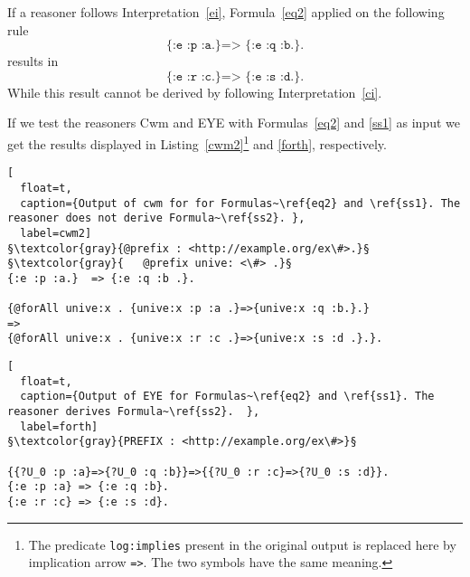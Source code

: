 If a reasoner follows Interpretation~\ref{ei}, Formula~\ref{eq2} applied on the following rule
\begin{equation}\label{ss1}
 \texttt{\{:e :p :a.\} => \{:e :q :b.\}.}
\end{equation}
results in
\begin{equation}\texttt{\{:e :r :c.\} => \{:e :s :d.\}.}\label{ss2}\end{equation}
While this result cannot be derived by following Interpretation~\ref{ci}. %


If we test the reasoners Cwm and EYE with Formulas~\ref{eq2} and \ref{ss1} as input we get the results displayed in Listing~\ref{cwm2}\footnote{The 
predicate \texttt{log:implies} present in the original output is replaced here by implication arrow \texttt{=>}. The two symbols have the same meaning.} and \ref{forth}, respectively.
\begin{lstlisting}[
  float=t,
  caption={Output of cwm for for Formulas~\ref{eq2} and \ref{ss1}. The reasoner does not derive Formula~\ref{ss2}. },
  label=cwm2]  
§\textcolor{gray}{@prefix : <http://example.org/ex\#>.}§
§\textcolor{gray}{   @prefix unive: <\#> .}§
{:e :p :a.}  => {:e :q :b .}.

{@forAll unive:x . {unive:x :p :a .}=>{unive:x :q :b.}.} 
=> 
{@forAll unive:x . {unive:x :r :c .}=>{unive:x :s :d .}.}.
\end{lstlisting}
\begin{lstlisting}[
  float=t,
  caption={Output of EYE for Formulas~\ref{eq2} and \ref{ss1}. The reasoner derives Formula~\ref{ss2}.  },
  label=forth]  
§\textcolor{gray}{PREFIX : <http://example.org/ex\#>}§

{{?U_0 :p :a}=>{?U_0 :q :b}}=>{{?U_0 :r :c}=>{?U_0 :s :d}}.
{:e :p :a} => {:e :q :b}.
{:e :r :c} => {:e :s :d}.
\end{lstlisting}

